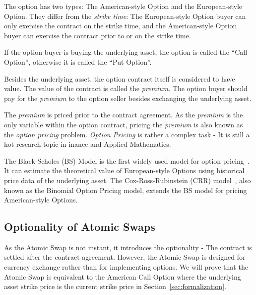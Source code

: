 The option has two types: The American-style Option and the European-style Option.
They differ from the \textit{strike time}:
The European-style Option buyer can only exercise the contract on the strike time,
and the American-style Option buyer can exercise the contract prior to or on the strike time.

If the option buyer is buying the underlying asset, the option is called the ``Call Option'', otherwise it is called the ``Put Option''.

Besides the underlying asset, the option contract itself is considered to have value.
The value of the contract is called the \textit{premium}.
The option buyer should pay for the \textit{premium} to the option seller besides exchanging the underlying asset.

The \textit{premium} is priced prior to the contract agreement.
As the \textit{premium} is the only variable within the option contract,
pricing the \textit{premium} is also known as the \textit{option pricing} problem.
\textit{Option Pricing} is rather a complex task - It is still a hot research topic in inance and Applied Mathematics.

The Black-Scholes (BS) Model is the first widely used model for option pricing~\cite{black1973pricing}.
It can estimate the theoretical value of European-style Options using historical price data of the underlying asset.
The Cox-Ross-Rubinstein (CRR) model~\cite{cox1979option}, also known as the Binomial Option Pricing model, extends the BS model for pricing American-style Options.

\subsection{Optionality of Atomic Swaps}

As the Atomic Swap is not instant, it introduces the optionality - The contract is settled after the contract agreement.
However, the Atomic Swap is designed for currency exchange rather than for implementing options.
We will prove that the Atomic Swap is equivalent to the American Call Option
where the underlying asset strike price is the current strike price in Section~\ref{sec:formalization}.